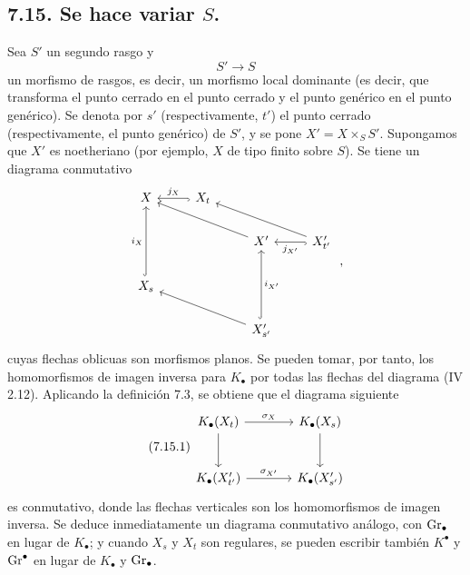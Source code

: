 \subsection*{7.15. Se hace variar \(S\).}
Sea \(S'\) un segundo rasgo y
\[
  S'\longrightarrow S
\]
un morfismo de rasgos, es decir, un morfismo local dominante (es decir, que transforma el punto cerrado en el punto cerrado y el punto genérico en el punto genérico). Se denota por \(s'\) (respectivamente, \(t'\)) el punto cerrado (respectivamente, el punto genérico) de \(S'\), y se pone \(X'=X\times_SS'\). Supongamos que \(X'\) es noetheriano (por ejemplo, \(X\) de tipo finito sobre \(S\)). Se tiene un diagrama conmutativo
\[
\begin{tikzcd}
X & X_t \arrow[l,hook,"j_X"'] & & \\
& & X' \arrow[ull] & X'_{t'} \arrow[l,hook,"\sisi{i'_{X'}}{j_{X'}}"] \arrow[ull] \\ %
X_s \arrow[uu,hook,"i_X"] & & & \\
& & X'_{s'} \arrow[uu,hook,"\sisi{j_{X'}}{i_{X'}}"'] \arrow[ull] &
\end{tikzcd}
\;,
\]
cuyas flechas oblicuas son morfismos planos. Se pueden tomar, por tanto, los homomorfismos de imagen inversa para \(K_\bullet\) por todas las flechas del diagrama (IV 2.12). Aplicando la definición 7.3, se obtiene que el diagrama siguiente
\begin{equation}\tag{7.15.1}
\begin{tikzcd}[column sep=large,row sep=large]
K_\bullet(X_t) \arrow[r,"\sigma_X"] \arrow[d] &
K_\bullet(X_s) \arrow[d]\\
K_\bullet(X'_{t'}) \arrow[r,"\sisi{\sigma_X}{\sigma_{X'}}"] & %
K_\bullet(X'_{s'})
\end{tikzcd}
\end{equation}
es conmutativo, donde las flechas verticales son los homomorfismos de imagen inversa. Se deduce inmediatamente un diagrama conmutativo análogo, con \(\operatorname{Gr}_\bullet\) en lugar de \(K_\bullet\); y cuando \(X_s\) y \(X_t\) son regulares, se pueden escribir también \(K^\bullet\) y \(\operatorname{Gr}^\bullet\) en lugar de \(K_\bullet\) y \(\operatorname{Gr}_\bullet\).

